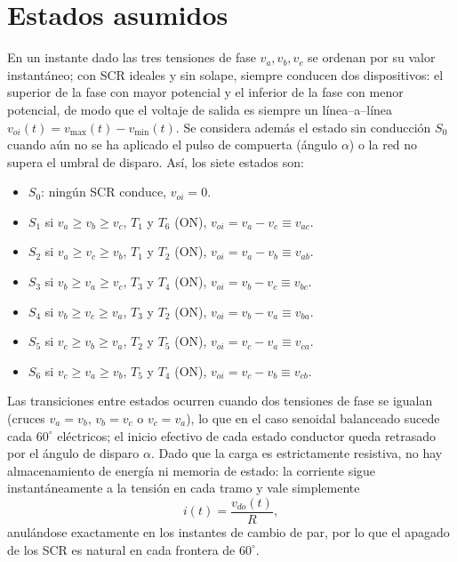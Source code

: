 \documentclass[conference]{IEEEtran}
\begin{document}
\section{Estados asumidos}

	En un instante dado las tres tensiones de fase $v_a,v_b,v_c$ se ordenan por su valor instantáneo; con SCR ideales y sin solape, siempre conducen dos dispositivos: el superior de la fase con mayor potencial y el inferior de la fase con menor potencial, de modo que el voltaje de salida es siempre un línea–a–línea $v_{oi}(t)=v_{\max}(t)-v_{\min}(t)$. Se considera además el estado sin conducción $S_0$ cuando aún no se ha aplicado el pulso de compuerta (ángulo $\alpha$) o la red no supera el umbral de disparo. Así, los siete estados son: 
	
	\begin{itemize}
		\item $S_0$: ningún SCR conduce, $v_{oi}=0$.
		\item $S_1$ si $v_a\ge v_b\ge v_c$, $T_1$ y $T_6$ (ON), $v_{oi}=v_a-v_c\equiv v_{ac}$.
		\item $S_2$ si $v_a\ge v_c\ge v_b$, $T_1$ y $T_2$ (ON), $v_{oi}=v_a-v_b\equiv v_{ab}$.
		\item $S_3$ si $v_b\ge v_a\ge v_c$, $T_3$ y $T_4$ (ON), $v_{oi}=v_b-v_c\equiv v_{bc}$.
		\item $S_4$ si $v_b\ge v_c\ge v_a$, $T_3$ y $T_2$ (ON), $v_{oi}=v_b-v_a\equiv v_{ba}$.
		\item $S_5$ si $v_c\ge v_b\ge v_a$, $T_2$ y $T_5$ (ON), $v_{oi}=v_c-v_a\equiv v_{ca}$.
		\item $S_6$ si $v_c\ge v_a\ge v_b$, $T_5$ y $T_4$ (ON), $v_{oi}=v_c-v_b\equiv v_{cb}$. 
	\end{itemize}

	Las transiciones entre estados ocurren cuando dos tensiones de fase se igualan (cruces $v_a=v_b$, $v_b=v_c$ o $v_c=v_a$), lo que en el caso senoidal balanceado sucede cada $60^\circ$ eléctricos; el inicio efectivo de cada estado conductor queda retrasado por el ángulo de disparo $\alpha$. Dado que la carga es estrictamente resistiva, no hay almacenamiento de energía ni memoria de estado: la corriente sigue instantáneamente a la tensión en cada tramo y vale simplemente
		\begin{equation*}
			i(t)=\frac{v_{do}(t)}{R},
		\end{equation*}
	anulándose exactamente en los instantes de cambio de par, por lo que el apagado de los SCR es natural en cada frontera de \(60^\circ\).
\end{document}
